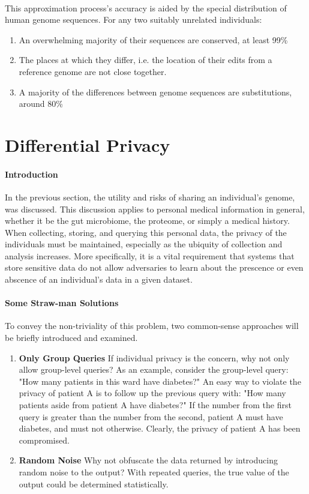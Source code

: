 \paragraph{}
This approximation process's accuracy is aided by the special distribution of human genome sequences. For any two suitably unrelated individuals:

\begin{enumerate}
\item An overwhelming majority of their sequences are conserved, at least 99\%
\item The places at which they differ, i.e. the location of their edits from a reference genome are not close together.
\item A majority of the differences between genome sequences are substitutions, around 80\%
\end{enumerate}

\section{Differential Privacy}

\paragraph{Introduction}
In the previous section, the utility and risks of sharing an individual's genome, was discussed. This discussion applies to personal medical information in general, whether it be the gut microbiome, the proteome, or simply a medical history. When collecting, storing, and querying this personal data, the privacy of the individuals must be maintained, especially as the ubiquity of collection and analysis increases. More specifically, it is a vital requirement that systems that store sensitive data do not allow adversaries to learn about the prescence or even abscence of an individual's data in a given dataset.

\paragraph{Some Straw-man Solutions}
To convey the non-triviality of this problem, two common-sense approaches will be briefly introduced and examined.

\begin{enumerate}
\item \textbf{Only Group Queries} If individual privacy is the concern, why not only allow group-level queries? As an example, consider the group-level query: "How many patients in this ward have diabetes?" An easy way to violate the privacy of patient A is to follow up the previous query with: "How many patients aside from patient A have diabetes?" If the number from the first query is greater than the number from the second, patient A must have diabetes, and must not otherwise. Clearly, the privacy of patient A has been compromised.
\item \textbf{Random Noise} Why not obfuscate the data returned by introducing random noise to the output? With repeated queries, the true value of the output could be determined statistically.
\end{enumerate}

